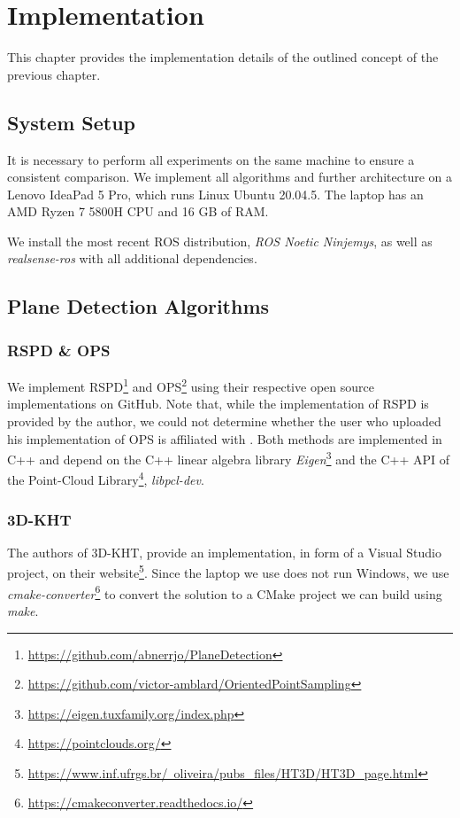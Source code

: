 \documentclass[main.tex]{subfiles}
\begin{document}
\chapter{Implementation}
This chapter provides the implementation details of the outlined concept of the previous chapter.
\section{System Setup}
It is necessary to perform all experiments on the same machine to ensure a consistent comparison.
We implement all algorithms and further architecture on a Lenovo IdeaPad 5 Pro,
which runs Linux Ubuntu 20.04.5. The laptop has an AMD Ryzen 7 5800H CPU and 16 GB of RAM.

We install the most recent ROS distribution, \textit{ROS Noetic Ninjemys}, as well as \textit{realsense-ros} with all additional dependencies.



\section{Plane Detection Algorithms}
\subsection{RSPD \& OPS}
We implement RSPD\footnote{\href{https://github.com/abnerrjo/PlaneDetection}{https://github.com/abnerrjo/PlaneDetection}} and OPS\footnote{\href{https://github.com/victor-amblard/OrientedPointSampling}{https://github.com/victor-amblard/OrientedPointSampling}} using their respective open source implementations on GitHub.
Note that, while the implementation of RSPD is provided by the author, we could not determine whether the user who uploaded his implementation of OPS is affiliated with \citeauthor{Sun_Mordohai_2019}\cite{Sun_Mordohai_2019}.
Both methods are implemented in C++ and depend on the C++ linear algebra library \textit{Eigen}\footnote{\href{https://eigen.tuxfamily.org/index.php}{https://eigen.tuxfamily.org/index.php}}
and the C++ API of the  Point-Cloud Library\footnote{\href{https://pointclouds.org/}{https://pointclouds.org/}}, \textit{libpcl-dev}.

\subsection{3D-KHT}

The authors of 3D-KHT, provide an implementation, in form of a Visual Studio project, on their website\footnote{\href{https://www.inf.ufrgs.br/~oliveira/pubs_files/HT3D/HT3D_page.html}
    {https://www.inf.ufrgs.br/~oliveira/pubs\_files/HT3D/HT3D\_page.html}}. Since the laptop we use does not run Windows, we use \textit{cmake-converter}\footnote{\href{https://cmakeconverter.readthedocs.io/en/latest/use.html}{https://cmakeconverter.readthedocs.io/}} to convert
the solution to a CMake project we can build using \textit{make}.
\end{document}
